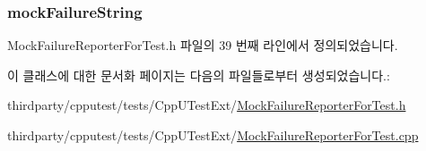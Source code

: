 \subsubsection[{\texorpdfstring{mock\+Failure\+String}{mockFailureString}}]{ mock\+Failure\+String}\hypertarget{class_mock_failure_reporter_for_test_a3d6ca4c1050ad39769b8d583dbbdc0be}{}\label{class_mock_failure_reporter_for_test_a3d6ca4c1050ad39769b8d583dbbdc0be}


Mock\+Failure\+Reporter\+For\+Test.\+h 파일의 39 번째 라인에서 정의되었습니다.



이 클래스에 대한 문서화 페이지는 다음의 파일들로부터 생성되었습니다.\+:\begin{DoxyCompactItemize}
\item 
thirdparty/cpputest/tests/\+Cpp\+U\+Test\+Ext/\hyperlink{_mock_failure_reporter_for_test_8h}{Mock\+Failure\+Reporter\+For\+Test.\+h}\item 
thirdparty/cpputest/tests/\+Cpp\+U\+Test\+Ext/\hyperlink{_mock_failure_reporter_for_test_8cpp}{Mock\+Failure\+Reporter\+For\+Test.\+cpp}\end{DoxyCompactItemize}

